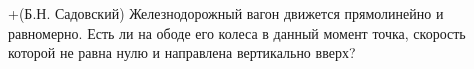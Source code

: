 +(Б.Н. Садовский)
Железнодорожный вагон движется прямолинейно и равномерно. Есть ли
на ободе его колеса в данный момент точка, скорость которой не равна
нулю и направлена вертикально вверх?
